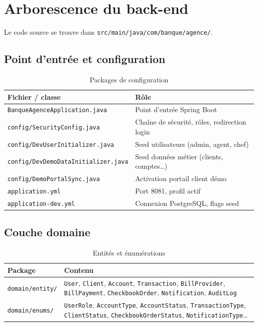 \documentclass[11pt,a4paper,oneside]{report}
\begin{document}
\section{Arborescence du back-end}

Le code source se trouve dans \texttt{src/main/java/com/banque/agence/}.

\subsection{Point d'entrée et configuration}

\begin{table}[H]
    \centering
    \caption{Packages de configuration}
    \label{tab:config}
    \small
    \begin{tabular}{@{}lp{9cm}@{}}
        \rowcolor{AmanaBrown}
        \color{white}\textbf{Fichier / classe} & \textbf{Rôle} \\
        \midrule
        \texttt{BanqueAgenceApplication.java} & Point d'entrée Spring Boot \\
        \texttt{config/SecurityConfig.java} & Chaîne de sécurité, rôles, redirection login \\
        \texttt{config/DevUserInitializer.java} & Seed utilisateurs (admin, agent, chef) \\
        \texttt{config/DevDemoDataInitializer.java} & Seed données métier (clients, comptes…) \\
        \texttt{config/DemoPortalSync.java} & Activation portail client démo \\
        \texttt{application.yml} & Port 8081, profil actif \\
        \texttt{application-dev.yml} & Connexion PostgreSQL, flags seed \\
        \bottomrule
    \end{tabular}
\end{table}

\subsection{Couche domaine}

\begin{table}[H]
    \centering
    \caption{Entités et énumérations}
    \label{tab:domain}
    \small
    \begin{tabular}{@{}lp{9cm}@{}}
        \rowcolor{AmanaBrown}
        \color{white}\textbf{Package} & \textbf{Contenu} \\
        \midrule
        \texttt{domain/entity/} & \texttt{User}, \texttt{Client}, \texttt{Account}, \texttt{Transaction}, \texttt{BillProvider}, \texttt{BillPayment}, \texttt{CheckbookOrder}, \texttt{Notification}, \texttt{AuditLog} \\
        \texttt{domain/enums/} & \texttt{UserRole}, \texttt{AccountType}, \texttt{AccountStatus}, \texttt{TransactionType}, \texttt{ClientStatus}, \texttt{CheckbookOrderStatus}, \texttt{NotificationType}… \\
        \bottomrule
    \end{tabular}
\end{table}
\end{document}
